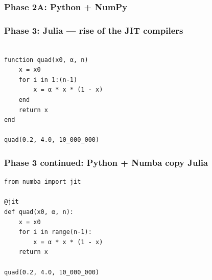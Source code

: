 \documentclass[
    xcolor={svgnames,dvipsnames},
    hyperref={colorlinks, citecolor=DeepPink4, linkcolor=DarkRed, urlcolor=DarkBlue}
    ]{beamer}  %
\newcommand{\1}{\mathbbm 1}
\begin{document}
\begin{frame}
    \frametitle{Phase 2A: Python + NumPy}

    
    \begin{figure}
       \begin{center} %
       \end{center}
    \end{figure}


\end{frame}



\begin{frame}[fragile]
    \frametitle{Phase 3: Julia --- rise of the JIT compilers}
    
    \begin{verbatim}

function quad(x0, α, n)
    x = x0
    for i in 1:(n-1)
        x = α * x * (1 - x)
    end
    return x
end

quad(0.2, 4.0, 10_000_000)
    \end{verbatim}

\end{frame}


\begin{frame}[fragile]
    \frametitle{Phase 3 continued: Python + Numba copy Julia}
    
    \begin{verbatim}
from numba import jit

@jit
def quad(x0, α, n):
    x = x0
    for i in range(n-1):
        x = α * x * (1 - x)
    return x

quad(0.2, 4.0, 10_000_000)
    \end{verbatim}

\end{frame}
\end{document}
